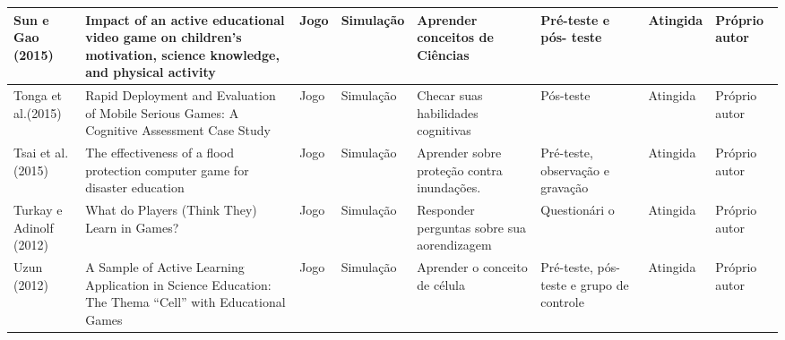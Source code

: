 \begin{table}
{\begin{tabular}{|L|m{5cm}|L|L|m{2.5cm}|m{2cm}|L|L|}
Sun e Gao (2015)               & Impact of an active educational video game on children's motivation, science knowledge, and physical activity                                                                                          & Jogo                  & Simulação           & Aprender conceitos de Ciências                                             & Pré-teste e pós- teste                                              & Atingida               & Próprio autor                                           \\ \hline
Tonga et al.(2015)             & Rapid Deployment and Evaluation of Mobile Serious Games: A Cognitive Assessment Case Study                                                                                                             & Jogo                  & Simulação           & Checar suas habilidades cognitivas                                         & Pós-teste                                                           & Atingida               & Próprio autor                                           \\ \hline
Tsai et al. (2015)             & The effectiveness of a flood protection computer game for disaster education                                                                                                                           & Jogo                  & Simulação           & Aprender sobre proteção contra inundações.                                 & Pré-teste, observação e gravação                                    & Atingida               & Próprio autor                                           \\ \hline
Turkay e Adinolf (2012)        & What do Players (Think They) Learn in Games?                                                                                                                                                           & Jogo                  & Simulação           & Responder perguntas sobre sua aorendizagem                                 & Questionári o                                                       & Atingida               & Próprio autor                                           \\ \hline
Uzun (2012)                    & A Sample of Active Learning Application in Science Education: The Thema “Cell” with Educational Games                                                                                                  & Jogo                  & Simulação           & Aprender o conceito de célula                                              & Pré-teste, pós-teste e grupo de controle                            & Atingida               & Próprio autor                                           \\ \hline
\end{tabular}}
\end{table}

